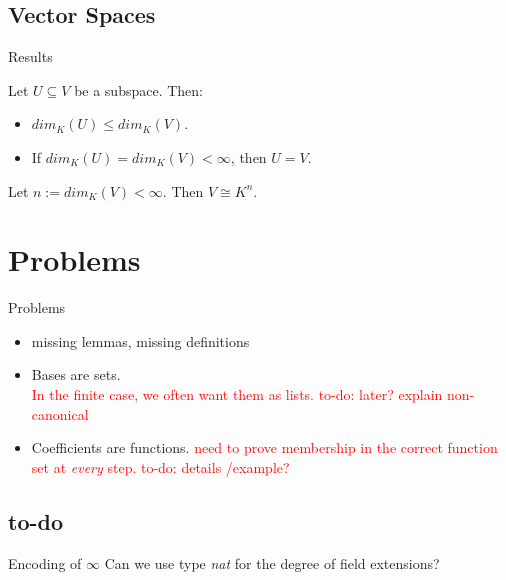 \documentclass[%
	sans,
	12pt,
]{beamer}
\newcommand{\bad}[1]{\textcolor{red}{#1}}
\begin{document}
\subsection{Vector Spaces}
\begin{frame}{Results}\pause
\begin{theorem}
	\upshape
	Let $U \subseteq V$ be a subspace. Then:
	\begin{itemize}
		\item $dim_K(U) \le dim_K(V)$.
		\item If $dim_K(U)=dim_K(V) < \infty$, then $U = V$.
	\end{itemize} %
\end{theorem}\pause
\begin{theorem}
	\upshape
	Let $n := dim_K(V) < \infty$. Then $V \cong K^n$.
\end{theorem}
\end{frame}

\section{Problems}
\begin{frame}{Problems}
\begin{itemize}
	\item missing lemmas, missing definitions\pause %
	\item Bases are sets.\\\pause
	\bad{In the finite case, we often want them as lists. to-do: later? explain non-canonical}
	\item Coefficients are functions.
	\bad{need to prove membership in the correct function set at \emph{every} step.
		to-do: details /example?}
\end{itemize}
\end{frame}

\subsection{to-do}
\begin{frame}{Encoding of $\infty$}%
Can we use type \emph{nat} for the degree of field extensions?\pause
{}
\end{frame}
\end{document}
